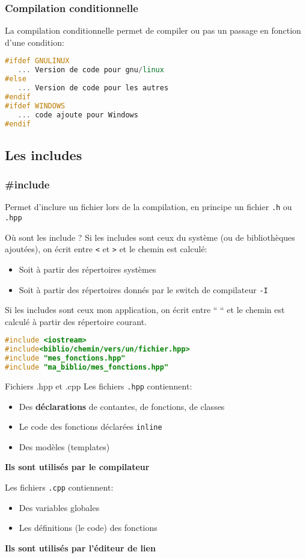 \documentclass{beamer}
\begin{document}
\begin{frame}[fragile=singleslide,shrink=20]
\frametitle {Compilation conditionnelle}
La compilation conditionnelle permet de compiler ou pas un passage en fonction 
d'une condition:
\begin{lstlisting}[language=c++]
#ifdef GNULINUX
   ... Version de code pour gnu/linux
#else
   ... Version de code pour les autres
#endif
#ifdef WINDOWS
   ... code ajoute pour Windows
#endif
\end{lstlisting}
\end{frame}

\subsection{Les includes}

\begin{frame}[fragile=singleslide,shrink=20]
\frametitle {\#include}
Permet d'inclure un fichier lors de la compilation, en principe un fichier \texttt{.h} ou \texttt{.hpp}

\begin{block}{Où sont les include ?}
Si les includes sont ceux du système (ou de bibliothèques ajoutées), on écrit entre \texttt{<} et \texttt{>}
et le chemin est calculé:

\begin{itemize}
\item{Soit à partir des répertoires systèmes}
\item{Soit à partir des répertoires donnés par le switch de compilateur \texttt{-I}}
\end{itemize}

Si les includes sont ceux mon application, on écrit entre `` ``
et le chemin est calculé à partir des répertoire courant.
\end{block}

\begin{lstlisting}[language=c++]
#include <iostream>
#include<biblio/chemin/vers/un/fichier.hpp>
#include "mes_fonctions.hpp"
#include "ma_biblio/mes_fonctions.hpp"
\end{lstlisting}

\begin{block}{Fichiers .hpp et .cpp}
Les fichiers \texttt{.hpp} contiennent:
\begin{itemize}
\item{Des \textbf{déclarations} de contantes, de fonctions, de classes}
\item{Le code des fonctions déclarées \texttt{inline}}
\item{Des modèles (templates)}
\end{itemize}
\textbf{Ils sont utilisés par le compilateur}

Les fichiers \texttt{.cpp} contiennent:
\begin{itemize}
\item{Des variables globales}
\item{Les définitions (le code) des fonctions}
\end{itemize}
\textbf{Ils sont utilisés par l'éditeur de lien}
\end{block}

\end{frame}
\end{document}
